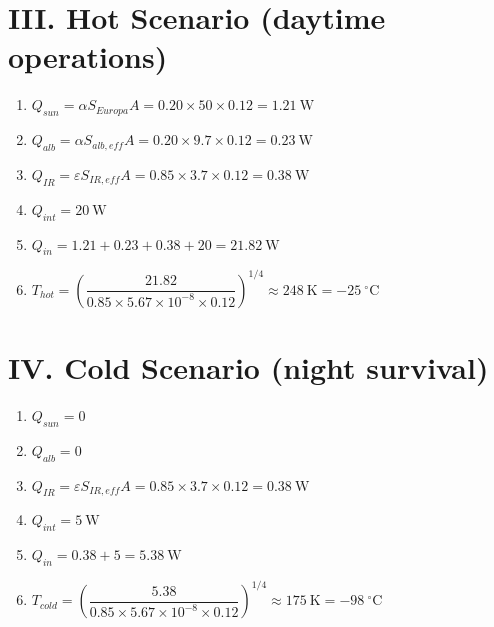 \documentclass[11pt]{article}
\begin{document}
\section*{III. Hot Scenario (daytime operations)}
\begin{enumerate}[label=\alph*.]
  \item $Q_{sun} = \alpha S_{Europa} A = 0.20 \times 50 \times 0.12 = 1.21\ \mathrm{W}$
  \item $Q_{alb} = \alpha S_{alb,eff} A = 0.20 \times 9.7 \times 0.12 = 0.23\ \mathrm{W}$
  \item $Q_{IR} = \varepsilon S_{IR,eff} A = 0.85 \times 3.7 \times 0.12 = 0.38\ \mathrm{W}$
  \item $Q_{int} = 20\ \mathrm{W}$
  \item $Q_{in} = 1.21 + 0.23 + 0.38 + 20 = 21.82\ \mathrm{W}$
  \item $T_{hot} = \left(\dfrac{21.82}{0.85 \times 5.67\times10^{-8} \times 0.12}\right)^{1/4} \approx 248\ \mathrm{K} = -25\ ^\circ\mathrm{C}$
\end{enumerate}

\section*{IV. Cold Scenario (night survival)}
\begin{enumerate}[label=\alph*.]
  \item $Q_{sun} = 0$
  \item $Q_{alb} = 0$
  \item $Q_{IR} = \varepsilon S_{IR,eff} A = 0.85 \times 3.7 \times 0.12 = 0.38\ \mathrm{W}$
  \item $Q_{int} = 5\ \mathrm{W}$
  \item $Q_{in} = 0.38 + 5 = 5.38\ \mathrm{W}$
  \item $T_{cold} = \left(\dfrac{5.38}{0.85 \times 5.67\times10^{-8} \times 0.12}\right)^{1/4} \approx 175\ \mathrm{K} = -98\ ^\circ\mathrm{C}$
\end{enumerate}
\end{document}
